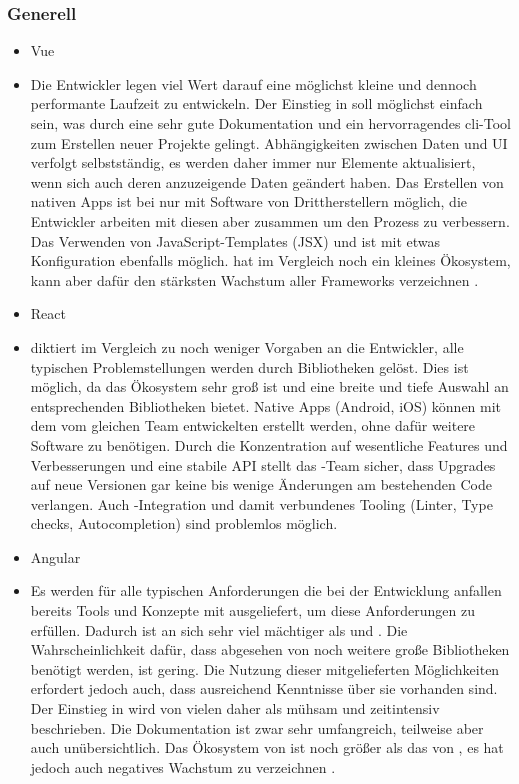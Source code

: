 \subsubsection{Generell}
\begin{itemize}
    \item{Vue}
    \item[] Die Entwickler legen viel Wert darauf eine möglichst kleine und dennoch performante Laufzeit zu entwickeln. Der Einstieg in  soll möglichst einfach sein, was durch eine sehr gute Dokumentation und ein hervorragendes \gls{cli}-Tool zum Erstellen neuer Projekte gelingt. Abhängigkeiten zwischen Daten und UI verfolgt  selbstständig, es werden daher immer nur Elemente aktualisiert, wenn sich auch deren anzuzeigende Daten geändert haben. Das Erstellen von nativen Apps ist bei  nur mit Software von Drittherstellern möglich, die Entwickler arbeiten mit diesen aber zusammen um den Prozess zu verbessern. Das Verwenden von JavaScript-Templates (JSX) und  ist mit etwas Konfiguration ebenfalls möglich.  hat im Vergleich noch ein kleines Ökosystem, kann aber dafür den stärksten Wachstum aller Frameworks verzeichnen \parencite[vgl.][]{npmjs_2018}.
    \item{React}
    \item[]  diktiert im Vergleich zu  noch weniger Vorgaben an die Entwickler, alle typischen Problemstellungen werden durch Bibliotheken gelöst. Dies ist möglich, da das Ökosystem sehr groß ist und eine breite und tiefe Auswahl an entsprechenden Bibliotheken bietet. Native Apps (Android, iOS) können mit dem vom gleichen Team entwickelten  erstellt werden, ohne dafür weitere Software zu benötigen. Durch die Konzentration auf wesentliche Features und Verbesserungen und eine stabile API stellt das -Team sicher, dass Upgrades auf neue Versionen gar keine bis wenige Änderungen am bestehenden Code verlangen. Auch -Integration und damit verbundenes Tooling (Linter, Type checks, Autocompletion) sind problemlos möglich.
    \item{Angular}
    \item[] Es werden für alle typischen Anforderungen die bei der Entwicklung anfallen bereits Tools und Konzepte mit ausgeliefert, um diese Anforderungen zu erfüllen. Dadurch ist  an sich sehr viel mächtiger als  und . Die Wahrscheinlichkeit dafür, dass abgesehen von  noch weitere große Bibliotheken benötigt werden, ist gering. Die Nutzung dieser mitgelieferten Möglichkeiten erfordert jedoch auch, dass ausreichend Kenntnisse über sie vorhanden sind. Der Einstieg in  wird von vielen daher als mühsam und zeitintensiv beschrieben. Die Dokumentation ist zwar sehr umfangreich, teilweise aber auch unübersichtlich. Das Ökosystem von  ist noch größer als das von , es hat jedoch auch negatives Wachstum zu verzeichnen \parencite[vgl.][]{npmjs_2018}.
\end{itemize}

